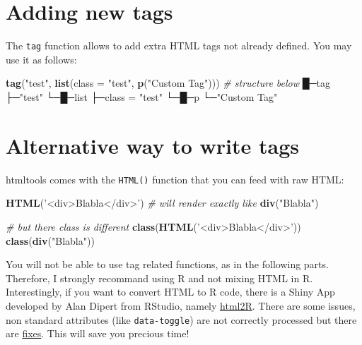 \documentclass[]{book}
\newenvironment{Shaded}{\begin{snugshade}}{\end{snugshade}}
\newcommand{\CommentTok}[1]{\textcolor[rgb]{0.56,0.35,0.01}{\textit{#1}}}
\newcommand{\DataTypeTok}[1]{\textcolor[rgb]{0.13,0.29,0.53}{#1}}
\newcommand{\KeywordTok}[1]{\textcolor[rgb]{0.13,0.29,0.53}{\textbf{#1}}}
\newcommand{\NormalTok}[1]{#1}
\newcommand{\StringTok}[1]{\textcolor[rgb]{0.31,0.60,0.02}{#1}}
\begin{document}
\hypertarget{adding-new-tags}{%
\section{Adding new tags}\label{adding-new-tags}}

The \texttt{tag} function allows to add extra HTML tags not already defined. You may use it as follows:

\begin{Shaded}
\begin{Highlighting}[]
\KeywordTok{tag}\NormalTok{(}\StringTok{"test"}\NormalTok{, }\KeywordTok{list}\NormalTok{(}\DataTypeTok{class =} \StringTok{"test"}\NormalTok{, }\KeywordTok{p}\NormalTok{(}\StringTok{"Custom Tag"}\NormalTok{)))}
\CommentTok{# structure below}
\NormalTok{█─tag }
\NormalTok{├─}\StringTok{"test"} 
\NormalTok{└─█─list }
\NormalTok{├─class =}\StringTok{ "test"} 
\NormalTok{└─█─p }
\NormalTok{└─}\StringTok{"Custom Tag"} 
\end{Highlighting}
\end{Shaded}

\hypertarget{alternative-way-to-write-tags}{%
\section{Alternative way to write tags}\label{alternative-way-to-write-tags}}

htmltools comes with the \texttt{HTML()} function that you can feed with raw HTML:

\begin{Shaded}
\begin{Highlighting}[]
\KeywordTok{HTML}\NormalTok{(}\StringTok{'<div>Blabla</div>'}\NormalTok{)}
\CommentTok{# will render exactly like}
\KeywordTok{div}\NormalTok{(}\StringTok{"Blabla"}\NormalTok{)}

\CommentTok{# but there class is different}
\KeywordTok{class}\NormalTok{(}\KeywordTok{HTML}\NormalTok{(}\StringTok{'<div>Blabla</div>'}\NormalTok{))}
\KeywordTok{class}\NormalTok{(}\KeywordTok{div}\NormalTok{(}\StringTok{"Blabla"}\NormalTok{))}
\end{Highlighting}
\end{Shaded}

You will not be able to use tag related functions, as in the following parts.
Therefore, I strongly recommand using R and not mixing HTML in R. Interestingly, if
you want to convert HTML to R code, there is a Shiny App developed by Alan
Dipert from RStudio, namely \href{https://github.com/alandipert/html2r}{html2R}. There
are some issues, non standard attributes (like \texttt{data-toggle}) are not correctly processed but there are \href{https://github.com/alandipert/html2r/issues/2}{fixes}. This will save you precious time!
\end{document}

